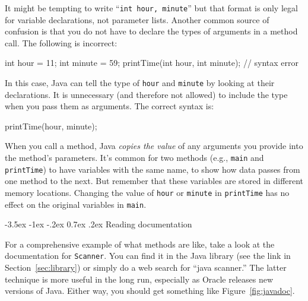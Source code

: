 \documentclass[12pt]{book}
\makeatletter
\theoremstyle{exercise}
\newcommand{\java}[1]{\verb"#1"}
\renewcommand{\section}{\@startsection {section}{1}{\z@}%
    {-3.5ex \@plus -1ex \@minus -.2ex}%
    {0.7ex \@plus.2ex}%
    {\normalfont\Large\bfseries}}
\newcommand{\java}[1]{\lstinline{#1}} %
\makeatother
\begin{document}
It might be tempting to write ``\java{int hour, minute}'' but that format is only legal for variable declarations, not parameter lists.
Another common source of confusion is that you do not have to declare the types of arguments in a method call.
The following is incorrect:

\begin{code}
    int hour = 11;
    int minute = 59;
    printTime(int hour, int minute);  // syntax error
\end{code}

In this case, Java can tell the type of \java{hour} and \java{minute} by looking at their declarations.
It is unnecessary (and therefore not allowed) to include the type when you pass them as arguments.
The correct syntax is:

\begin{code}
    printTime(hour, minute);
\end{code}

When you call a method, Java {\it copies the value} of any arguments you provide into the method's parameters.
It's common for two methods (e.g., \java{main} and \java{printTime}) to have variables with the same name, to show how data passes from one method to the next.
But remember that these variables are stored in different memory locations.
Changing the value of \java{hour} or \java{minute} in \java{printTime} has no effect on the original variables in \java{main}.


\section{Reading documentation}
\label{sec:apidocs}


For a comprehensive example of what methods are like, take a look at the documentation for \java{Scanner}.
You can find it in the Java library (see the link in Section~\ref{sec:library}) or simply do a web search for ``java scanner.''
The latter technique is more useful in the long run, especially as Oracle releases new versions of Java.
Either way, you should get something like Figure~\ref{fig:javadoc}.
\end{document}
